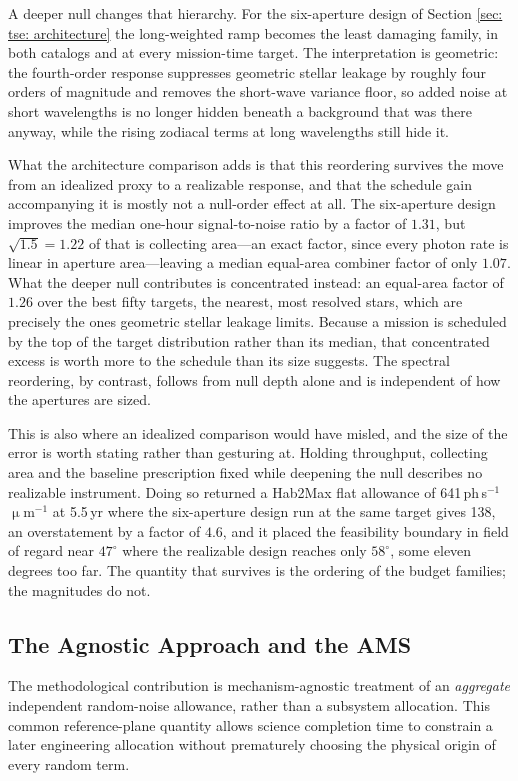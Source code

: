 \documentclass[12pt,a4paper]{article}
\numberwithin{equation}{section}
\numberwithin{figure}{section}
\numberwithin{table}{section}
\begin{document}
A deeper null changes that hierarchy. For the six-aperture design of Section \ref{sec: tse: architecture} the long-weighted ramp becomes the least damaging family, in both catalogs and at every mission-time target. The interpretation is geometric: the fourth-order response suppresses geometric stellar leakage by roughly four orders of magnitude and removes the short-wave variance floor, so added noise at short wavelengths is no longer hidden beneath a background that was there anyway, while the rising zodiacal terms at long wavelengths still hide it.

What the architecture comparison adds is that this reordering survives the move from an idealized proxy to a realizable response, and that the schedule gain accompanying it is mostly not a null-order effect at all. The six-aperture design improves the median one-hour signal-to-noise ratio by a factor of $1.31$, but $\sqrt{1.5}=1.22$ of that is collecting area---an exact factor, since every photon rate is linear in aperture area---leaving a median equal-area combiner factor of only $1.07$. What the deeper null contributes is concentrated instead: an equal-area factor of $1.26$ over the best fifty targets, the nearest, most resolved stars, which are precisely the ones geometric stellar leakage limits. Because a mission is scheduled by the top of the target distribution rather than its median, that concentrated excess is worth more to the schedule than its size suggests. The spectral reordering, by contrast, follows from null depth alone and is independent of how the apertures are sized.

This is also where an idealized comparison would have misled, and the size of the error is worth stating rather than gesturing at. Holding throughput, collecting area and the baseline prescription fixed while deepening the null describes no realizable instrument. Doing so returned a Hab2Max flat allowance of 641\,ph\,s$^{-1}$\,$\upmu$m$^{-1}$ at 5.5\,yr where the six-aperture design run at the same target gives 138, an overstatement by a factor of $4.6$, and it placed the feasibility boundary in field of regard near $47^\circ$ where the realizable design reaches only $58^\circ$, some eleven degrees too far. The quantity that survives is the ordering of the budget families; the magnitudes do not.

\subsection{The Agnostic Approach and the AMS}
The methodological contribution is mechanism-agnostic treatment of an \emph{aggregate} independent random-noise allowance, rather than a subsystem allocation. This common reference-plane quantity allows science completion time to constrain a later engineering allocation without prematurely choosing the physical origin of every random term.
\end{document}
